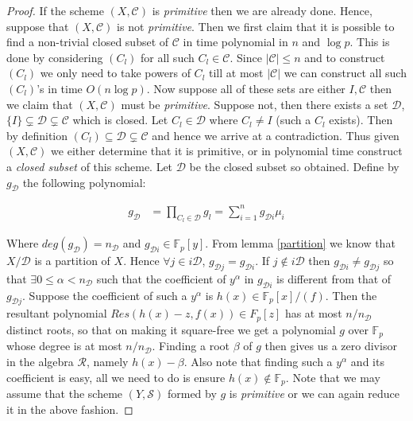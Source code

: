 	\begin{proof}If the scheme $(X,\mathcal{C})$ is \emph{primitive} then we are already done. Hence, suppose that $(X,\mathcal{C})$ is not \emph{primitive}. Then we first claim that it is possible to find a non-trivial closed
		subset of $\mathcal{C}$ in time polynomial in $n$ and $\log{p}$. This is done by considering $(C_l)$ for all such $C_l \in \mathcal{C}$. Since $|\mathcal{C}| \le n$ and to construct $(C_l)$ we only need to take powers
		of $C_l$ till at most $|\mathcal{C}|$ we can construct all such $(C_l)$'s in time $O(n\log{p})$. Now suppose all of these sets are either $I,\mathcal{C}$ then we claim that $(X,\mathcal{C})$ must be \emph{primitive}.
		Suppose not, then there exists a set $\mathcal{D}$, $\{I\} \subsetneq \mathcal{D} \subsetneq \mathcal{C}$ which is closed. Let $C_l \in \mathcal{D}$ where $C_l \neq I$ (such a $C_l$ exists). Then by definition
		$(C_l) \subseteq \mathcal{D} \subsetneq \mathcal{C}$ and hence we arrive at a contradiction. Thus given $(X,\mathcal{C})$ we either determine that it is primitive, or in polynomial time construct a \emph{closed
		subset} of this scheme. Let $\mathcal{D}$ be the closed subset so obtained. Define by $g_{\mathcal{D}}$ the following polynomial:

		\begin{align*}
			g_{\mathcal{D}} &= \prod_{C_l \in \mathcal{D}} g_l = \sum_{i=1}^n g_{\mathcal{D}i} \mu_i
		\end{align*}

		Where $deg(g_{\mathcal{D}}) = n_{\mathcal{D}}$ and $g_{\mathcal{D}i} \in \mathbb{F}_p[y]$. From lemma \ref{partition} we know that $X/\mathcal{D}$ is a partition of $X$. Hence $\forall j \in i\mathcal{D}$, 
		$g_{\mathcal{D}j}=g_{\mathcal{D}i}$. If $j \notin i\mathcal{D}$ then $g_{\mathcal{D}i} \neq g_{\mathcal{D}j}$ so that $\exists 0 \le \alpha < n_{\mathcal{D}}$ such that the coefficient of $y^{\alpha}$ in
		$g_{\mathcal{D}i}$ is different from that of $g_{\mathcal{D}j}$. Suppose the coefficient of such a $y^{\alpha}$ is $h(x) \in \mathbb{F}_p[x]/(f)$. Then the resultant polynomial $Res(h(x)-z,f(x)) \in F_p[z]$ has
		at most $n/n_{\mathcal{D}}$ distinct roots, so that on making it square-free we get a polynomial $g$ over $\mathbb{F}_p$ whose degree is at most $n/n_{\mathcal{D}}$. Finding a root $\beta$ of $g$ then gives us a zero
		divisor in the algebra $\mathcal{R}$, namely $h(x)-\beta$. Also note that finding such a $y^\alpha$ and its coefficient is easy, all we need to do is ensure $h(x) \notin \mathbb{F}_p$. Note that we may assume that
		the scheme $(Y,\mathcal{S})$ formed by $g$ is \emph{primitive} or we can again reduce it in the above fashion.
	\end{proof}
	
